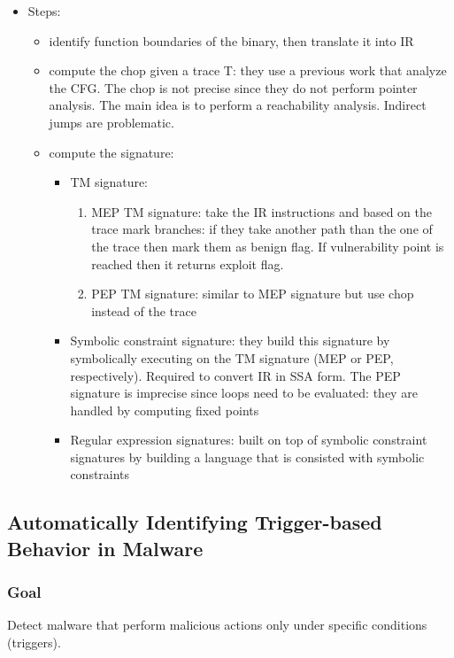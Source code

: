 \documentclass[10pt, a4paper]{article}
\begin{document}
\begin{itemize}
\begin{itemize}
    \end{itemize}
  \item Steps:
    \begin{itemize}
      \item identify function boundaries of the binary, then translate it into IR
      \item compute the chop given a trace T: they use a previous work that analyze the CFG. The chop is not precise since they do not perform pointer analysis. The main idea is to perform a reachability analysis. Indirect jumps are problematic.
      \item compute the signature:
        \begin{itemize}
          \item TM signature:
            \begin{enumerate}
              \item MEP TM signature:
              take the IR instructions and based on the trace mark branches: if they take another path than the one of the trace then mark them as benign flag. If vulnerability point is reached then it returns exploit flag.
              \item PEP TM signature: similar to MEP signature but use chop instead of the trace
            \end{enumerate}
          \item Symbolic constraint signature: they build this signature by symbolically executing on the TM signature (MEP or PEP, respectively). Required to convert IR in SSA form. The PEP signature is imprecise since loops need to be evaluated: they are handled by computing fixed points
          \item Regular expression signatures: built on top of symbolic constraint signatures by building a language that is consisted with symbolic constraints
        \end{itemize}
    \end{itemize}
\end{itemize}

\subsection{\cite{MineSweeper-BOTNET08} Automatically Identifying Trigger-based Behavior in Malware} 

\subsubsection{Goal}
Detect malware that perform malicious actions only under specific conditions (triggers).
\end{document}
